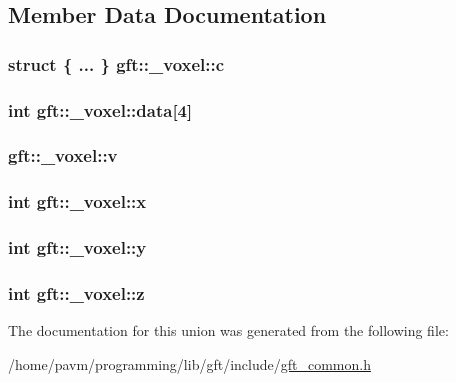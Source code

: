 \subsection{Member Data Documentation}
\hypertarget{uniongft_1_1__voxel_a09994e1c11c4d497bab28c94f31310b6}{
\subsubsection[{c}]{\setlength{\rightskip}{0pt plus 5cm}struct \{ ... \}   gft\-::\-\_\-voxel\-::c}}\label{uniongft_1_1__voxel_a09994e1c11c4d497bab28c94f31310b6}
\hypertarget{uniongft_1_1__voxel_ab9da4ff03d07abfb109290aa6c89bbfa}{
\subsubsection[{data}]{\setlength{\rightskip}{0pt plus 5cm}int gft\-::\-\_\-voxel\-::data\mbox{[}4\mbox{]}}}\label{uniongft_1_1__voxel_ab9da4ff03d07abfb109290aa6c89bbfa}
\hypertarget{uniongft_1_1__voxel_a2d02a792ebdbe150d40c793c411427cc}{
\subsubsection[{v}]{ gft\-::\-\_\-voxel\-::v}}\label{uniongft_1_1__voxel_a2d02a792ebdbe150d40c793c411427cc}
\hypertarget{uniongft_1_1__voxel_a92cbd3417badf2a82c1d67e1dca64f2c}{
\subsubsection[{x}]{\setlength{\rightskip}{0pt plus 5cm}int gft\-::\-\_\-voxel\-::x}}\label{uniongft_1_1__voxel_a92cbd3417badf2a82c1d67e1dca64f2c}
\hypertarget{uniongft_1_1__voxel_a306aef8adb8d3f922f25b1e967f05a8e}{
\subsubsection[{y}]{\setlength{\rightskip}{0pt plus 5cm}int gft\-::\-\_\-voxel\-::y}}\label{uniongft_1_1__voxel_a306aef8adb8d3f922f25b1e967f05a8e}
\hypertarget{uniongft_1_1__voxel_a0aa0b6dd2c8fc9c40ba3ddb3ac3f610b}{
\subsubsection[{z}]{\setlength{\rightskip}{0pt plus 5cm}int gft\-::\-\_\-voxel\-::z}}\label{uniongft_1_1__voxel_a0aa0b6dd2c8fc9c40ba3ddb3ac3f610b}


The documentation for this union was generated from the following file\-:\begin{DoxyCompactItemize}
\item 
/home/pavm/programming/lib/gft/include/\hyperlink{gft__common_8h}{gft\-\_\-common.\-h}\end{DoxyCompactItemize}
